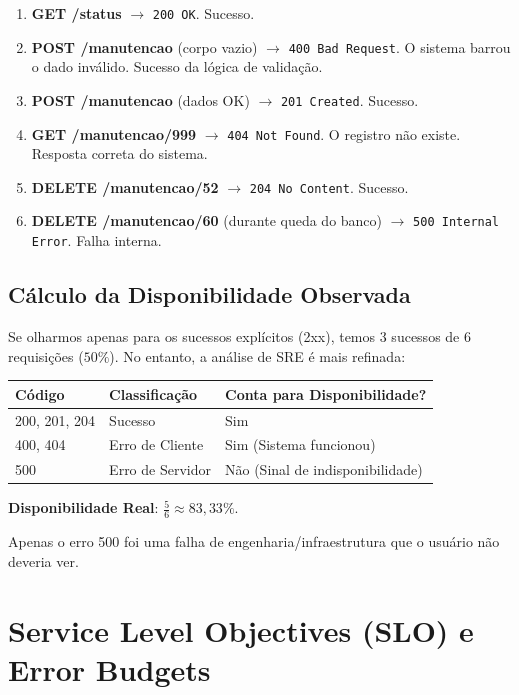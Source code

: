 \documentclass[12pt,a4paper]{report}
\begin{document}
\begin{enumerate}
    \item \textbf{GET /status} $\rightarrow$ \texttt{200 OK}. Sucesso.
    \item \textbf{POST /manutencao} (corpo vazio) $\rightarrow$ \texttt{400 Bad Request}. O sistema barrou o dado inválido. Sucesso da lógica de validação.
    \item \textbf{POST /manutencao} (dados OK) $\rightarrow$ \texttt{201 Created}. Sucesso.
    \item \textbf{GET /manutencao/999} $\rightarrow$ \texttt{404 Not Found}. O registro não existe. Resposta correta do sistema.
    \item \textbf{DELETE /manutencao/52} $\rightarrow$ \texttt{204 No Content}. Sucesso.
    \item \textbf{DELETE /manutencao/60} (durante queda do banco) $\rightarrow$ \texttt{500 Internal Error}. Falha interna.
\end{enumerate}

\subsection{Cálculo da Disponibilidade Observada}

Se olharmos apenas para os sucessos explícitos (2xx), temos 3 sucessos de 6 requisições ($50\%$). No entanto, a análise de SRE é mais refinada:

\begin{table}[h]
\centering
\begin{tabular}{@{}lll@{}}
\toprule
\textbf{Código} & \textbf{Classificação} & \textbf{Conta para Disponibilidade?} \\ \midrule
200, 201, 204   & Sucesso                & Sim                                 \\
400, 404        & Erro de Cliente        & Sim (Sistema funcionou)            \\
500             & Erro de Servidor       & Não (Sinal de indisponibilidade)   \\ \bottomrule
\end{tabular}
\end{table}

\textbf{Disponibilidade Real}: $\frac{5}{6} \approx 83,33\%$.

Apenas o erro 500 foi uma falha de engenharia/infraestrutura que o usuário não deveria ver.

\section{Service Level Objectives (SLO) e Error Budgets}
\end{document}
